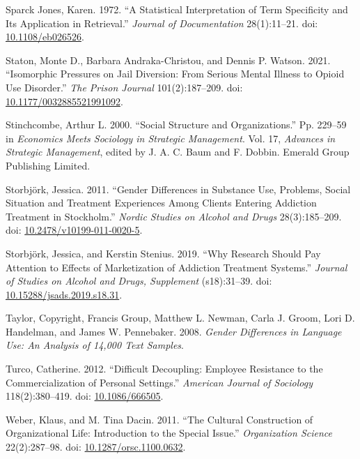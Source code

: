 \documentclass[
  12pt,
]{article}
\begin{document}
\leavevmode\hypertarget{ref-sparckjones1972}{}%
Sparck Jones, Karen. 1972. ``A Statistical Interpretation of Term Specificity and Its Application in Retrieval.'' \emph{Journal of Documentation} 28(1):11--21. doi: \href{https://doi.org/10.1108/eb026526}{10.1108/eb026526}.

\leavevmode\hypertarget{ref-staton2021}{}%
Staton, Monte D., Barbara Andraka-Christou, and Dennis P. Watson. 2021. ``Isomorphic Pressures on Jail Diversion: From Serious Mental Illness to Opioid Use Disorder.'' \emph{The Prison Journal} 101(2):187--209. doi: \href{https://doi.org/10.1177/0032885521991092}{10.1177/0032885521991092}.

\leavevmode\hypertarget{ref-stinchcombe2000}{}%
Stinchcombe, Arthur L. 2000. ``Social Structure and Organizations.'' Pp. 229--59 in \emph{Economics Meets Sociology in Strategic Management}. Vol. 17, \emph{Advances in Strategic Management}, edited by J. A. C. Baum and F. Dobbin. Emerald Group Publishing Limited.

\leavevmode\hypertarget{ref-storbjork2011}{}%
Storbjörk, Jessica. 2011. ``Gender Differences in Substance Use, Problems, Social Situation and Treatment Experiences Among Clients Entering Addiction Treatment in Stockholm.'' \emph{Nordic Studies on Alcohol and Drugs} 28(3):185--209. doi: \href{https://doi.org/10.2478/v10199-011-0020-5}{10.2478/v10199-011-0020-5}.

\leavevmode\hypertarget{ref-storbjork2019}{}%
Storbjörk, Jessica, and Kerstin Stenius. 2019. ``Why Research Should Pay Attention to Effects of Marketization of Addiction Treatment Systems.'' \emph{Journal of Studies on Alcohol and Drugs, Supplement} (s18):31--39. doi: \href{https://doi.org/10.15288/jsads.2019.s18.31}{10.15288/jsads.2019.s18.31}.

\leavevmode\hypertarget{ref-taylor2008}{}%
Taylor, Copyright, Francis Group, Matthew L. Newman, Carla J. Groom, Lori D. Handelman, and James W. Pennebaker. 2008. \emph{Gender Differences in Language Use: An Analysis of 14,000 Text Samples}.

\leavevmode\hypertarget{ref-turco2012}{}%
Turco, Catherine. 2012. ``Difficult Decoupling: Employee Resistance to the Commercialization of Personal Settings.'' \emph{American Journal of Sociology} 118(2):380--419. doi: \href{https://doi.org/10.1086/666505}{10.1086/666505}.

\leavevmode\hypertarget{ref-weber2011}{}%
Weber, Klaus, and M. Tina Dacin. 2011. ``The Cultural Construction of Organizational Life: Introduction to the Special Issue.'' \emph{Organization Science} 22(2):287--98. doi: \href{https://doi.org/10.1287/orsc.1100.0632}{10.1287/orsc.1100.0632}.
\end{document}

